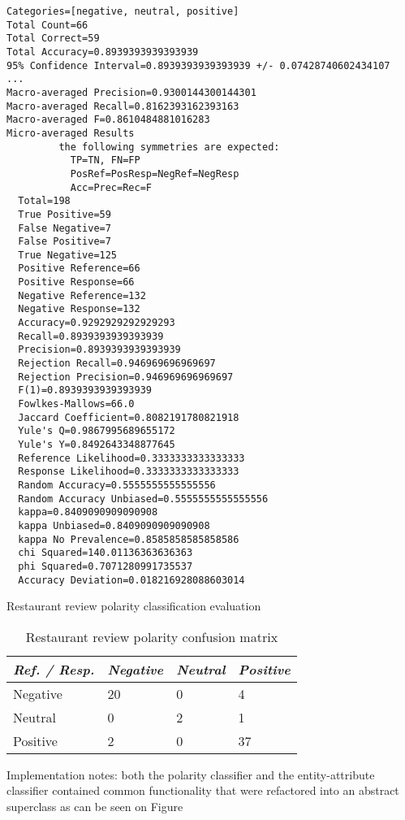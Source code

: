 \begin{listing}
\begin{verbatim}
Categories=[negative, neutral, positive]
Total Count=66
Total Correct=59
Total Accuracy=0.8939393939393939
95% Confidence Interval=0.8939393939393939 +/- 0.07428740602434107
...
Macro-averaged Precision=0.9300144300144301
Macro-averaged Recall=0.8162393162393163
Macro-averaged F=0.8610484881016283
Micro-averaged Results
         the following symmetries are expected:
           TP=TN, FN=FP
           PosRef=PosResp=NegRef=NegResp
           Acc=Prec=Rec=F
  Total=198
  True Positive=59
  False Negative=7
  False Positive=7
  True Negative=125
  Positive Reference=66
  Positive Response=66
  Negative Reference=132
  Negative Response=132
  Accuracy=0.9292929292929293
  Recall=0.8939393939393939
  Precision=0.8939393939393939
  Rejection Recall=0.946969696969697
  Rejection Precision=0.946969696969697
  F(1)=0.8939393939393939
  Fowlkes-Mallows=66.0
  Jaccard Coefficient=0.8082191780821918
  Yule's Q=0.9867995689655172
  Yule's Y=0.8492643348877645
  Reference Likelihood=0.3333333333333333
  Response Likelihood=0.3333333333333333
  Random Accuracy=0.5555555555555556
  Random Accuracy Unbiased=0.5555555555555556
  kappa=0.8409090909090908
  kappa Unbiased=0.8409090909090908
  kappa No Prevalence=0.8585858585858586
  chi Squared=140.01136363636363
  phi Squared=0.7071280991735537
  Accuracy Deviation=0.018216928088603014
\end{verbatim}
\caption{Restaurant review polarity classification evaluation}
\label{listing:polarityRestaurantEval}
\end{listing}

\begin{table}[ht]
\footnotesize
\centering
\begin{tabular}{llll}
\toprule
  \emph{Ref. / Resp.} & \emph{Negative} & \emph{Neutral} & \emph{Positive}\\
\midrule
  Negative&20&0&4\\
  Neutral&0&2&1\\
  Positive&2&0&37\\
\bottomrule
\hline
\end{tabular}
\caption{Restaurant review polarity confusion matrix}
\label{tab:confMatrixRestaurantPolarity}
\end{table}

Implementation notes: both the polarity classifier and the entity-attribute
classifier contained common functionality that were refactored into an abstract
superclass as can be seen on Figure 

